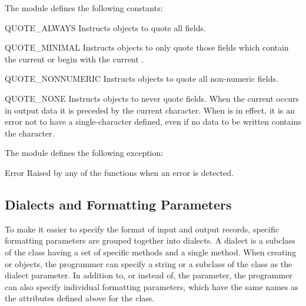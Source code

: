 The  module defines the following constants:

\begin{datadesc}{QUOTE_ALWAYS}
Instructs  objects to quote all fields.
\end{datadesc}

\begin{datadesc}{QUOTE_MINIMAL}
Instructs  objects to only quote those fields which contain
the current  or begin with the current .
\end{datadesc}

\begin{datadesc}{QUOTE_NONNUMERIC}
Instructs  objects to quote all non-numeric fields.
\end{datadesc}

\begin{datadesc}{QUOTE_NONE}
Instructs  objects to never quote fields.  When the current
 occurs in output data it is preceded by the current
 character.  When  is in effect, it
is an error not to have a single-character  defined, even if
no data to be written contains the  character.
\end{datadesc}


The  module defines the following exception:

\begin{excdesc}{Error}
Raised by any of the functions when an error is detected.
\end{excdesc}


\subsection{Dialects and Formatting Parameters\label{fmt-params}}

To make it easier to specify the format of input and output records,
specific formatting parameters are grouped together into dialects.  A
dialect is a subclass of the  class having a set of specific
methods and a single  method.  When creating 
or  objects, the programmer can specify a string or a subclass
of the  class as the dialect parameter.  In addition to, or
instead of, the  parameter, the programmer can also specify
individual formatting parameters, which have the same names as the
attributes defined above for the  class.


